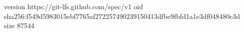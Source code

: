 version https://git-lfs.github.com/spec/v1
oid sha256:f549d5983015ebf7765af272257490239150413dfbe9fbfd1a1e3df048480c3d
size 87544
